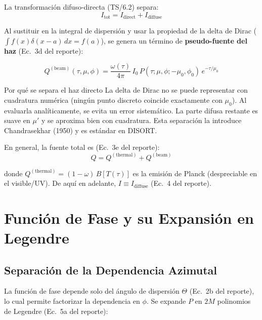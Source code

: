 \documentclass[a4paper,11pt]{article}
\begin{document}
La transformaci\'on difuso-directa (TS/6.2) separa:
\begin{equation}
    I_{\text{tot}} = I_{\text{direct}} + I_{\text{diffuse}}
\end{equation}

Al sustituir en la integral de dispersi\'on y usar la propiedad de la delta de
Dirac ($\int f(x)\delta(x-a)\,dx = f(a)$), se genera un t\'ermino de
\textbf{pseudo-fuente del haz} (Ec.~3d del reporte):

\begin{equation}\label{eq:q_beam}
    Q^{(\text{beam})}(\tau,\mu,\phi) = \frac{\omega(\tau)}{4\pi}\,I_0\,
    P(\tau;\mu,\phi;-\mu_0,\phi_0)\,e^{-\tau/\mu_0}
\end{equation}

\begin{physics}{Por qu\'e se separa el haz directo}
La delta de Dirac no se puede representar con cuadratura num\'erica (ning\'un
punto discreto coincide exactamente con $\mu_0$).  Al evaluarla
anal\'iticamente, se evita un error sistem\'atico.  La parte difusa restante
es suave en $\mu'$ y se aproxima bien con cuadratura.  Esta separaci\'on la
introduce Chandrasekhar (1950) y es est\'andar en DISORT.
\end{physics}

En general, la fuente total es (Ec.~3e del reporte):
\begin{equation}
    Q = Q^{(\text{thermal})} + Q^{(\text{beam})}
\end{equation}

donde $Q^{(\text{thermal})} = (1-\omega)\,B[T(\tau)]$ es la emisi\'on de Planck
(despreciable en el visible/UV).  De aqu\'i en adelante, $I \equiv I_{\text{diffuse}}$
(Ec.~4 del reporte).


\section{Funci\'on de Fase y su Expansi\'on en Legendre}

\subsection{Separaci\'on de la Dependencia Azimutal}

La funci\'on de fase depende solo del \'angulo de dispersi\'on $\Theta$ (Ec.~2b
del reporte), lo cual permite factorizar la dependencia en $\phi$.  Se expande
$P$ en $2M$ polinomios de Legendre (Ec.~5a del reporte):
\end{document}
